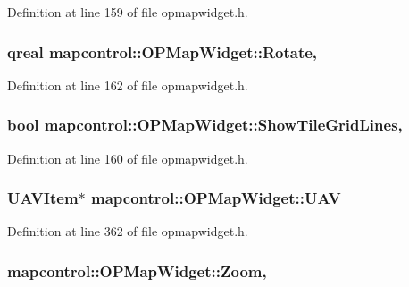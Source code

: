 Definition at line 159 of file opmapwidget.\-h.

\hypertarget{group___o_p_map_widget_gac0960d6e34ea06d84ddad72f930a3917}{
\subsubsection[{Rotate}]{\setlength{\rightskip}{0pt plus 5cm}qreal mapcontrol\-::\-O\-P\-Map\-Widget\-::\-Rotate\hspace{0.3cm}{\ttfamily [read]}, {\ttfamily [write]}}}\label{group___o_p_map_widget_gac0960d6e34ea06d84ddad72f930a3917}


Definition at line 162 of file opmapwidget.\-h.

\hypertarget{group___o_p_map_widget_ga41a15a2c8198b2ad76d2b494917a02ed}{
\subsubsection[{Show\-Tile\-Grid\-Lines}]{\setlength{\rightskip}{0pt plus 5cm}bool mapcontrol\-::\-O\-P\-Map\-Widget\-::\-Show\-Tile\-Grid\-Lines\hspace{0.3cm}{\ttfamily [read]}, {\ttfamily [write]}}}\label{group___o_p_map_widget_ga41a15a2c8198b2ad76d2b494917a02ed}


Definition at line 160 of file opmapwidget.\-h.

\hypertarget{group___o_p_map_widget_gabb5c6c7e07970a7f9b774ebf94cd2286}{
\subsubsection[{U\-A\-V}]{\setlength{\rightskip}{0pt plus 5cm}U\-A\-V\-Item$\ast$ mapcontrol\-::\-O\-P\-Map\-Widget\-::\-U\-A\-V}}\label{group___o_p_map_widget_gabb5c6c7e07970a7f9b774ebf94cd2286}


Definition at line 362 of file opmapwidget.\-h.

\hypertarget{group___o_p_map_widget_gadc46820d44c2517e9a6014ddede98099}{
\subsubsection[{Zoom}]{ mapcontrol\-::\-O\-P\-Map\-Widget\-::\-Zoom\hspace{0.3cm}{\ttfamily [read]}, {\ttfamily [write]}}}\label{group___o_p_map_widget_gadc46820d44c2517e9a6014ddede98099}


